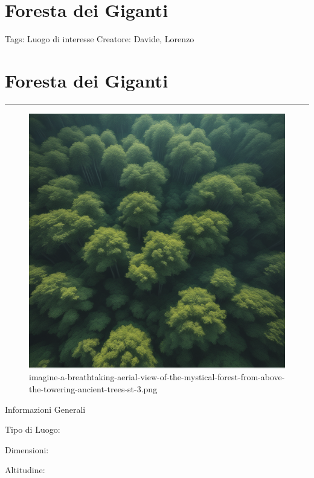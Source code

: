 \section{Foresta dei Giganti}\label{foresta-dei-giganti}

Tags: Luogo di interesse Creatore: Davide, Lorenzo

\section{Foresta dei Giganti}\label{foresta-dei-giganti-1}

\begin{center}\rule{0.5\linewidth}{0.5pt}\end{center}

\begin{figure}
\centering
\includegraphics{imagine-a-breathtaking-aerial-view-of-the-mystical-forest-from-above-the-towering-ancient-trees-st-3.png}
\caption{imagine-a-breathtaking-aerial-view-of-the-mystical-forest-from-above-the-towering-ancient-trees-st-3.png}
\end{figure}

Informazioni Generali

Tipo di Luogo:

Dimensioni:

Altitudine:


